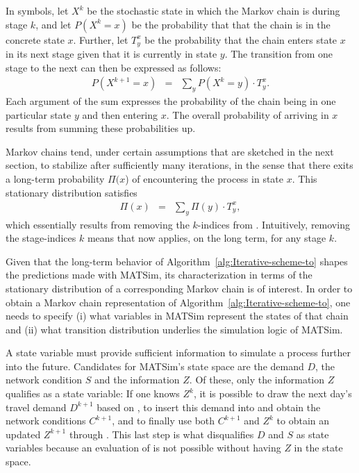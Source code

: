In symbols, let $X^{k}$ be the stochastic state in which the Markov
chain is during stage $k$, and let $P(X^{k}=x)$ be the probability
that that the chain is in the concrete state $x$. Further, let $T_{y}^{x}$
be the probability that the chain enters state $x$ in its next stage
given that it is currently in state $y$. The transition from one
stage to the next can then be expressed as follows:
\begin{eqnarray}
P(X^{k+1}=x) & = & \sum_{y}P(X^{k}=y)\cdot T_{y}^{x}.\label{eq:one-mc-transition}
\end{eqnarray}
Each argument of the sum expresses the probability of the chain being
in one particular state $y$ and then entering $x$. The overall probability
of arriving in $x$ results from summing these probabilities up.

Markov chains tend, under certain assumptions that are sketched in
the next section, to stabilize after sufficiently many iterations,
in the sense that there exits a long-term probability $\Pi(x$) of
encountering the process in state $x$. This stationary distribution
satisfies
\begin{eqnarray}
\Pi(x) & = & \sum_{y}\Pi(y)\cdot T_{y}^{x},\label{eq:mc-stationary}
\end{eqnarray}
which essentially results from removing the $k$-indices from .
Intuitively, removing the stage-indices $k$ means that 
now applies, on the long term, for any stage $k$.

Given that the long-term behavior of Algorithm~\ref{alg:Iterative-scheme-to}
shapes the predictions made with MATSim, its characterization in terms
of the stationary distribution of a corresponding Markov chain is
of interest. In order to obtain a Markov chain representation of Algorithm~\ref{alg:Iterative-scheme-to},
one needs to specify (i) what variables in MATSim represent the states
of that chain and (ii) what transition distribution underlies the
simulation logic of MATSim.

A state variable must provide sufficient information to simulate a
process further into the future. Candidates for MATSim's state space
are the demand $D$, the network condition $S$ and the information
$Z$. Of these, only the information $Z$ qualifies as a state variable:
If one knows $Z^{k}$, it is possible to draw the next day's travel
demand $D^{k+1}$ based on , to insert this
demand into  and obtain the network
conditions $C^{k+1}$, and to finally use both $C^{k+1}$ and $Z^{k}$
to obtain an updated $Z^{k+1}$ through .
This last step is what disqualifies $D$ and $S$ as state variables
because an evaluation of  is not possible
without having $Z$ in the state space.

